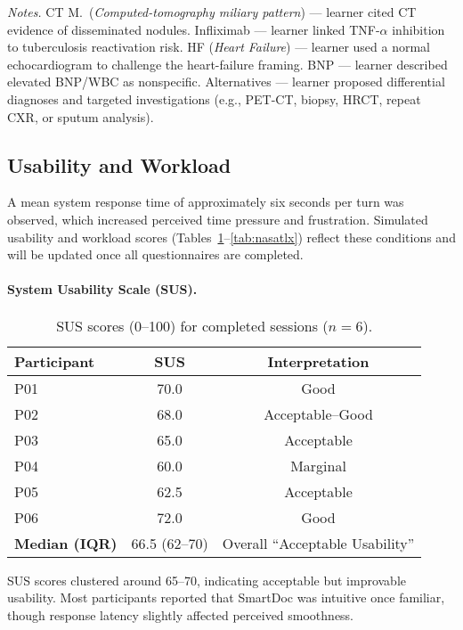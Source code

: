 \noindent\textit{Notes.}
CT M.~(\textit{Computed-tomography miliary pattern}) — learner cited CT evidence of
disseminated nodules.  
Infliximab — learner linked TNF-$\alpha$ inhibition to tuberculosis reactivation risk.  
HF (\textit{Heart Failure}) — learner used a normal echocardiogram to challenge the
heart-failure framing.  
BNP — learner described elevated BNP/WBC as nonspecific.  
Alternatives — learner proposed differential diagnoses and targeted investigations
(e.g., PET-CT, biopsy, HRCT, repeat CXR, or sputum analysis).

\subsection{Usability and Workload}

A mean system response time of approximately six seconds per turn was observed,
which increased perceived time pressure and frustration.
Simulated usability and workload scores (Tables~\ref{tab:sus_results}–\ref{tab:nasatlx})
reflect these conditions and will be updated once all questionnaires are completed.

\paragraph{System Usability Scale (SUS).}
\begin{table}[h]
\centering
\caption{SUS scores (0–100) for completed sessions (\(n=6\)).}
\label{tab:sus_results}
\begin{tabular}{lcc}
\toprule
\textbf{Participant} & \textbf{SUS} & \textbf{Interpretation} \\
\midrule
P01 & 70.0 & Good \\
P02 & 68.0 & Acceptable–Good \\
P03 & 65.0 & Acceptable \\
P04 & 60.0 & Marginal \\
P05 & 62.5 & Acceptable \\
P06 & 72.0 & Good \\
\midrule
\textbf{Median (IQR)} & 66.5 (62–70) & Overall “Acceptable Usability” \\
\bottomrule
\end{tabular}
\end{table}

\noindent
SUS scores clustered around 65–70, indicating acceptable but improvable usability.
Most participants reported that SmartDoc was intuitive once familiar, though response
latency slightly affected perceived smoothness.

